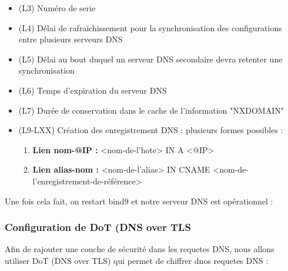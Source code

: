 \documentclass{article}
\begin{document}
\begin{itemize}
	\item (L3) Numéro de serie
	\item (L4) Délai de rafraichissement pour la synchronisation des configurations entre plusieurs serveurs DNS
	\item (L5) Délai au bout duquel un serveur DNS secondaire devra retenter une synchronisation
	\item (L6) Temps d'expiration du serveur DNS
	\item (L7) Durée de conservation dans le cache de l'information "NXDOMAIN"
	\item (L9-LXX) Création des enregistrement DNS : plusieurs formes possibles :
	\begin{enumerate}
		\item \textbf{Lien nom-@IP :}	<nom-de-l'hote>   	IN	A		<@IP>
		\item \textbf{Lien alias-nom :}	<nom-de-l'alias> 	IN	CNAME 	<nom-de-l'enregistrement-de-référence>
	\end{enumerate}		  
\end{itemize}

Une fois cela fait, on restart bind9 et notre serveur DNS est opérationnel :


\subsubsection{Configuration de DoT (DNS over TLS}
Afin de rajouter une couche de sécurité dans les requetes DNS, nous allons utiliser DoT (DNS over TLS) qui permet de chiffrer dnos requetes DNS :
\end{document}
